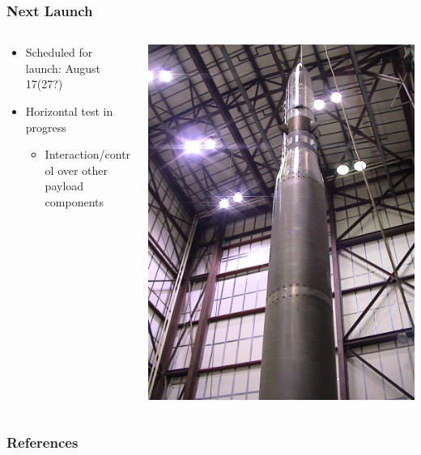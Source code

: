 \documentclass[landscape,xcolor={table}]{beamer}
\begin{document}
	\begin{frame}
		
		\frametitle{Next Launch}
		
		\begin{columns}[T] %
		\begin{column}{.49\textwidth}

			\begin{itemize}
				\item Scheduled for launch: August 17(27?)
				\item Horizontal test in progress
				\begin{itemize}
					\item Interaction/control over other payload components
				\end{itemize}
			\end{itemize}			
			
		\end{column}%
		\hfill%
		\begin{column}{.49\textwidth}

			\includegraphics[width=\textwidth]{images/high}
					
		\end{column}%
		\end{columns}

	\end{frame}
	
	\begin{frame}
		\frametitle{References}
		
		
		
	\end{frame}
	
\end{document}
